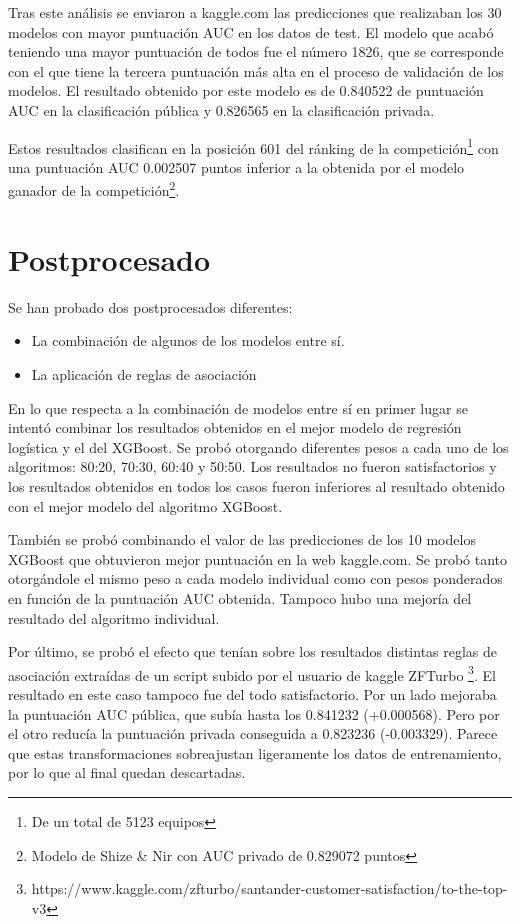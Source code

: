 \documentclass[11pt,a4paper,spanish]{article} %
\begin{document}
Tras este análisis se enviaron a kaggle.com las predicciones que realizaban los 30 modelos con mayor puntuación AUC en los datos de test. El modelo que acabó teniendo una mayor puntuación de todos fue el número 1826, que se corresponde con el que tiene la tercera puntuación más alta en el proceso de validación de los modelos. El resultado obtenido por este modelo es de 0.840522 de puntuación AUC en la clasificación pública y 0.826565 en la clasificación privada.

Estos resultados clasifican en la posición 601 del ránking de la competición\footnote{De un total de 5123 equipos} con una puntuación AUC 0.002507 puntos inferior a la obtenida por el modelo ganador de la competición\footnote{Modelo de Shize \& Nir con AUC privado de 0.829072 puntos}. 

\newpage

\section{Postprocesado}

Se han probado dos postprocesados diferentes: 

\begin{itemize}

	\item{La combinación de algunos de los modelos entre sí.}
	
	\item{La aplicación de reglas de asociación}

\end{itemize}

En lo que respecta a la combinación de modelos entre sí en primer lugar se intentó combinar los resultados obtenidos en el mejor modelo de regresión logística y el del XGBoost. Se probó otorgando diferentes pesos a cada uno de los algoritmos: 80:20, 70:30, 60:40 y 50:50. Los resultados no fueron satisfactorios y los resultados obtenidos en todos los casos fueron inferiores al resultado obtenido con el mejor modelo del algoritmo XGBoost. 

También se probó combinando el valor de las predicciones de los 10 modelos XGBoost que obtuvieron mejor puntuación en la web kaggle.com. Se probó tanto otorgándole el mismo peso a cada modelo individual como con pesos ponderados en función de la puntuación AUC obtenida. Tampoco hubo una mejoría del resultado del algoritmo individual.

Por último, se probó el efecto que tenían sobre los resultados distintas reglas de asociación extraídas de un script subido por el usuario de kaggle ZFTurbo \footnote{https://www.kaggle.com/zfturbo/santander-customer-satisfaction/to-the-top-v3}. El resultado en este caso tampoco fue del todo satisfactorio. Por un lado mejoraba la puntuación AUC pública, que subía hasta los 0.841232 (+0.000568). Pero por el otro reducía la puntuación privada conseguida a 0.823236 (-0.003329). Parece que estas transformaciones sobreajustan ligeramente los datos de entrenamiento, por lo que al final quedan descartadas.
\end{document}
